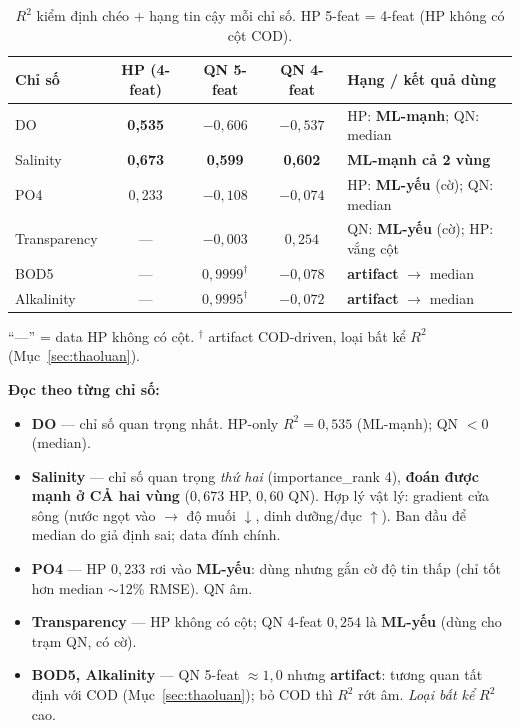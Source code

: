 \begin{table}[h]
\centering\small
\caption{$R^2$ kiểm định chéo + hạng tin cậy mỗi chỉ số. HP 5-feat = 4-feat (HP không có cột COD).}
\label{tab:r2}
\begin{tabular}{lcccl}
\toprule
\textbf{Chỉ số} & \textbf{HP (4-feat)} & \textbf{QN 5-feat} & \textbf{QN 4-feat} & \textbf{Hạng / kết quả dùng} \\
\midrule
DO            & \textbf{0{,}535} & $-0{,}606$ & $-0{,}537$ & HP: \textbf{ML-mạnh}; QN: median \\
Salinity      & \textbf{0{,}673} & \textbf{0{,}599} & \textbf{0{,}602} & \textbf{ML-mạnh cả 2 vùng} \\
PO4           & $0{,}233$ & $-0{,}108$ & $-0{,}074$ & HP: \textbf{ML-yếu} (cờ); QN: median \\
Transparency  & --- & $-0{,}003$ & $0{,}254$ & QN: \textbf{ML-yếu} (cờ); HP: vắng cột \\
BOD5          & --- & $0{,}9999^\dagger$ & $-0{,}078$ & \textbf{artifact} $\to$ median \\
Alkalinity    & --- & $0{,}9995^\dagger$ & $-0{,}072$ & \textbf{artifact} $\to$ median \\
\bottomrule
\end{tabular}

{\footnotesize ``---'' = data HP không có cột. $^\dagger$ artifact COD-driven, loại bất kể $R^2$ (Mục~\ref{sec:thaoluan}).}
\end{table}

\textbf{Đọc theo từng chỉ số:}
\begin{itemize}[nosep]
  \item \textbf{DO} --- chỉ số quan trọng nhất. HP-only $R^2=0{,}535$ (ML-mạnh); QN $<0$ (median).
  \item \textbf{Salinity} --- chỉ số quan trọng \emph{thứ hai} (importance\_rank 4), \textbf{đoán được mạnh ở CẢ hai vùng} ($0{,}673$ HP, $0{,}60$ QN). Hợp lý vật lý: gradient cửa sông (nước ngọt vào $\to$ độ muối $\downarrow$, dinh dưỡng/đục $\uparrow$). Ban đầu để median do giả định sai; data đính chính.
  \item \textbf{PO4} --- HP $0{,}233$ rơi vào \textbf{ML-yếu}: dùng nhưng gắn cờ độ tin thấp (chỉ tốt hơn median $\sim$12\% RMSE). QN âm.
  \item \textbf{Transparency} --- HP không có cột; QN 4-feat $0{,}254$ là \textbf{ML-yếu} (dùng cho trạm QN, có cờ).
  \item \textbf{BOD5, Alkalinity} --- QN 5-feat $\approx1{,}0$ nhưng \textbf{artifact}: tương quan tất định với COD (Mục~\ref{sec:thaoluan}); bỏ COD thì $R^2$ rớt âm. \emph{Loại bất kể} $R^2$ cao.
\end{itemize}

